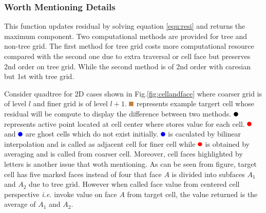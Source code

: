 \documentclass[a4paper]{article}
\newcommand{\target}{\tikz \fill[brown] (2pt,2pt) rectangle (8pt,8pt);}
\newcommand{\activetest}{\tikz \fill[black] (3pt,3pt) circle (3pt);}
\newcommand{\prolong}{\tikz \fill[blue] (3pt,3pt) circle (3pt);}
\newcommand{\rest}{\tikz \fill[red] (3pt,3pt) circle (3pt);}
\begin{document}
\subsubsection{Worth Mentioning Details}
This function updates residual by solving equation \ref{equ:resi} and returns the maximum component. Two computational methods are provided for tree and non-tree grid. The first method for tree grid costs more computational resource compared with the second one due to extra traversal or cell face but preserves 2nd order on tree grid. While the second method is of 2nd order with caresian but 1st with tree grid.\par
Consider quadtree for 2D cases shown in Fig.\ref{fig:cellandface} where coarser grid is of level $l$ and finer grid is of level $l+1$. $\target$ represents example targert cell whose residual will be compute to display the difference between two methods. $\activetest$ represents active point located at cell center where stores value for each cell. $\rest$ and $\prolong$ are ghost cells which do not exist initially. $\prolong$ is caculated by bilinear interpolation and is called as adjacent cell for finer cell while $\rest$ is obtained by averaging and is called from coarser cell. Moreover, cell faces highlighted by letters is another issue that woth mentioning. As can be seen from figure, target cell has five marked faces instead of four that face $A$ is divided into subfaces $A_1$ and $A_2$ due to tree grid. However when called face value from centered cell perspective \emph{i.e.} invoke value on face $A$ from target cell, the value returned is the average of $A_1$ and $A_2$. 
\end{document}
